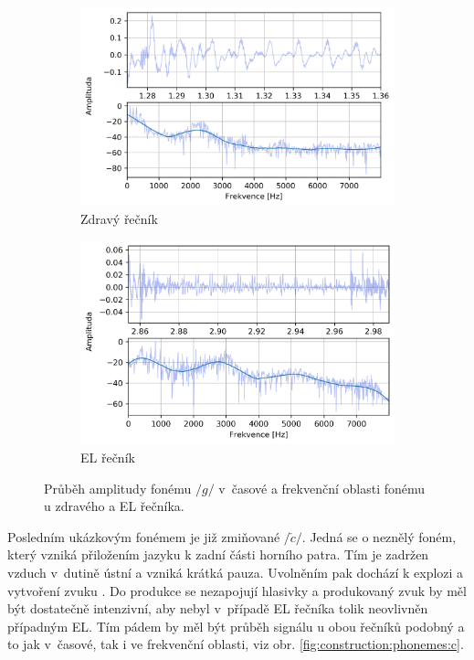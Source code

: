 \begin{figure}[htpb]
  \centering
  \begin{subfigure}[b]{0.45\textwidth}
    \includegraphics[width=\textwidth]{./ch5-construction/img/signal-normal_g.png}
    \caption{Zdravý řečník}
    \label{fig:construction:phonemes:g:normal}
  \end{subfigure}
  \begin{subfigure}[b]{0.45\textwidth}
    \includegraphics[width=\textwidth]{./ch5-construction/img/signal-el_g.png}
    \caption{EL řečník}
    \label{fig:construction:phonemes:g:el}
  \end{subfigure}
  \caption[Průběh amplitudy fonému $/g/$ zdravého a EL řečníka.]{Průběh amplitudy fonému $/g/$ v~časové a frekvenční oblasti fonému u zdravého a EL řečníka.}
  \label{fig:construction:phonemes:g}
\end{figure}

Posledním ukázkovým fonémem je již zmiňované $/\check{c}/$.
Jedná se o neznělý foném, který vzniká přiložením jazyku k zadní části horního patra.
Tím je zadržen vzduch v~dutině ústní a vzniká krátká pauza.
Uvolněním pak dochází k explozi a vytvoření zvuku \cite{Psutka2006}.
Do produkce se nezapojují hlasivky a produkovaný zvuk by měl být dostatečně intenzivní, aby nebyl v~případě EL řečníka tolik neovlivněn případným EL.
Tím pádem by měl být průběh signálu u obou řečníků podobný a to jak v~časové, tak i ve frekvenční oblasti, viz obr. \ref{fig:construction:phonemes:c}.

